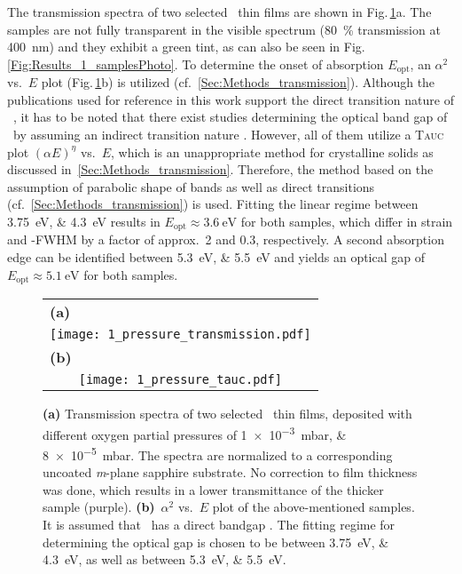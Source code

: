 The transmission spectra of two selected \cro\ thin films are shown in Fig.\,\ref{Fig:Results_1_transmission}a.
The samples are not fully transparent in the visible spectrum (\qty{80}{\percent} transmission at \qty{400}{\nm}) and they exhibit a green tint, as can also be seen in Fig.\,\ref{Fig:Results_1_samplesPhoto}.
To determine the onset of absorption $E_\mathrm{opt}$, an $\alpha^2$ vs.\ $E$ plot (Fig.\,\ref{Fig:Results_1_transmission}b) is utilized (cf.~\ref{Sec:Methods_transmission}).
Although the publications used for reference in this work support the direct transition nature of \cro\ 
    \cite{farrell2015,mi2018},
it has to be noted that there exist studies determining the optical band gap of \cro\ by assuming an indirect transition nature 
    \cite{cheng1996,al-kuhaili2007}.
However, all of them utilize a \textsc{Tauc} plot $(\alpha E)^\eta$ vs.\ $E$, which is an unappropriate method for crystalline solids as discussed in~\ref{Sec:Methods_transmission}.
Therefore, the method based on the assumption of parabolic shape of bands as well as direct transitions (cf.\ \ref{Sec:Methods_transmission}) is used.
Fitting the linear regime between \qtylist{3.75;4.3}{\eV} results in $E_\mathrm{opt}\approx\qty{3.6}{\eV}$ for both samples, which differ in strain and \textomega-FWHM by a factor of approx.\ 2 and 0.3, respectively.
A second absorption edge can be identified between \qtylist{5.3;5.5}{\eV} and yields an optical gap of $E_\mathrm{opt}\approx\qty{5.1}{\eV}$ for both samples.
\begin{figure}[ht]
    \centering
    \begin{tabular}{c}
        \multicolumn{1}{l}{\textbf{(a)}}\figSpace\\
        \texttt{[image: 1\_pressure\_transmission.pdf]}\figSpace\\
        \multicolumn{1}{l}{\textbf{(b)}}\figSpace\\
        \texttt{[image: 1\_pressure\_tauc.pdf]}
    \end{tabular}
    \caption{\textbf{(a)} Transmission spectra of two selected \cro\ thin films, deposited with different oxygen partial pressures of \qtylist{1e-3;8e-5}{\milli\bar}.
    The spectra are normalized to a corresponding uncoated \textit{m}-plane sapphire substrate.
    No correction to film thickness was done, which results in a lower transmittance of the thicker sample (purple).
    \textbf{(b)}~$\alpha^2$ vs.\ $E$ plot of the above-mentioned samples.
    It is assumed that \cro\ has a direct bandgap
        \cite{farrell2015,mi2018}.
    The fitting regime for determining the optical gap is chosen to be between \qtylist{3.75;4.3}{\eV}, as well as between \qtylist{5.3;5.5}{\eV}.
    }
    \label{Fig:Results_1_transmission}
\end{figure}